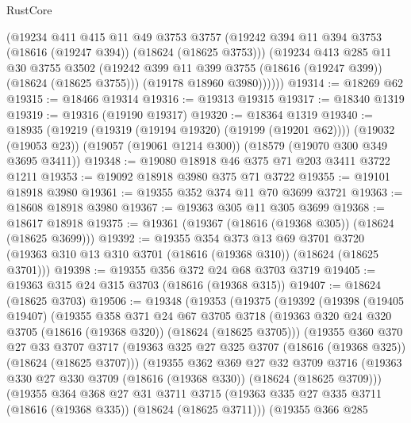 \begin{lexlean}{RustCore}
\begin{coremodule}
          (@19234
            @411
            @415
            @11
            @49
            @3753
            @3757
            (@19242 @394 @11 @394 @3753 (@18616 (@19247 @394)) (@18624 (@18625 @3753)))
            (@19234
              @413
              @285
              @11
              @30
              @3755
              @3502
              (@19242 @399 @11 @399 @3755 (@18616 (@19247 @399)) (@18624 (@18625 @3755)))
              (@19178 @18960 @3980))))))
@19314 := @18269 @62
@19315 := @18466 @19314
@19316 := @19313 @19315
@19317 := @18340 @1319
@19319 := @19316 (@19190 @19317)
@19320 := @18364 @1319
@19340 := @18935
    (@19219 (@19319 (@19194 @19320) (@19199 (@19201 @62))))
    (@19032 (@19053 @23))
    (@19057 (@19061 @1214 @300))
    (@18579 (@19070 @300 @349 @3695 @3411))
@19348 := @19080 @18918 @46 @375 @71 @203 @3411 @3722 @1211
@19353 := @19092 @18918 @3980 @375 @71 @3722
@19355 := @19101 @18918 @3980
@19361 := @19355 @352 @374 @11 @70 @3699 @3721
@19363 := @18608 @18918 @3980
@19367 := @19363 @305 @11 @305 @3699
@19368 := @18617 @18918
@19375 := @19361 (@19367 (@18616 (@19368 @305)) (@18624 (@18625 @3699)))
@19392 := @19355
    @354
    @373
    @13
    @69
    @3701
    @3720
    (@19363 @310 @13 @310 @3701 (@18616 (@19368 @310)) (@18624 (@18625 @3701)))
@19398 := @19355 @356 @372 @24 @68 @3703 @3719
@19405 := @19363 @315 @24 @315 @3703 (@18616 (@19368 @315))
@19407 := @18624 (@18625 @3703)
@19506 := @19348
    (@19353
      (@19375
        (@19392
          (@19398
            (@19405 @19407)
            (@19355
              @358
              @371
              @24
              @67
              @3705
              @3718
              (@19363 @320 @24 @320 @3705 (@18616 (@19368 @320)) (@18624 (@18625 @3705)))
              (@19355
                @360
                @370
                @27
                @33
                @3707
                @3717
                (@19363 @325 @27 @325 @3707 (@18616 (@19368 @325)) (@18624 (@18625 @3707)))
                (@19355
                  @362
                  @369
                  @27
                  @32
                  @3709
                  @3716
                  (@19363 @330 @27 @330 @3709 (@18616 (@19368 @330)) (@18624 (@18625 @3709)))
                  (@19355
                    @364
                    @368
                    @27
                    @31
                    @3711
                    @3715
                    (@19363 @335 @27 @335 @3711 (@18616 (@19368 @335)) (@18624 (@18625 @3711)))
                    (@19355
                      @366
                      @285

\end{coremodule}
\end{lexlean}
